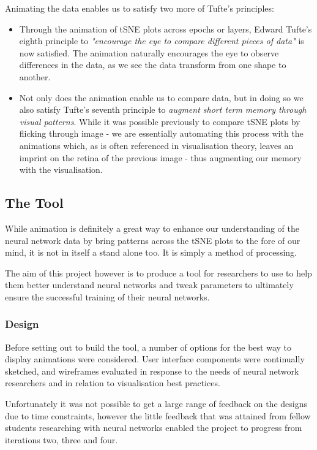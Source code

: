 \documentclass[a4paper,11pt,titlepage]{article}
\begin{document}
	Animating the data enables us to satisfy two more of Tufte's principles:
	\begin{itemize}
		\item Through the animation of tSNE plots across epochs or layers, Edward Tufte's eighth principle to \textit{"encourage the eye to compare different pieces of data"} is now satisfied. The animation naturally encourages the eye to observe differences in the data, as we see the data transform from one shape to another. 
		\item Not only does the animation enable us to compare data, but in doing so we also satisfy Tufte's seventh principle to \textit{augment short term memory through visual patterns}. While it was possible previously to compare tSNE plots by flicking through image - we are essentially automating this process with the animations which, as is often referenced in visualisation theory, leaves an imprint on the retina of the previous image - thus augmenting our memory with the visualisation. 
	\end{itemize}
	
	\subsection{The Tool}
	While animation is definitely a great way to enhance our understanding of the neural network data by bring patterns across the tSNE plots to the fore of our mind, it is not in itself a stand alone too. It is simply a method of processing. 
	\par 
	The aim of this project however is to produce a tool for researchers to use to help them better understand neural networks and tweak parameters to ultimately ensure the successful training of their neural networks.
	\par 
	
	\subsubsection{Design}
	Before setting out to build the tool, a number of options for the best way to display animations were considered. User interface components were continually sketched, and wireframes evaluated in response to the needs of neural network researchers and in relation to visualisation best practices. 
	\par 
	Unfortunately it was not possible to get a large range of feedback on the designs due to time constraints, however the little feedback that was attained from fellow students researching with neural networks enabled the project to progress from iterations two, three and four. 
	
\end{document}
